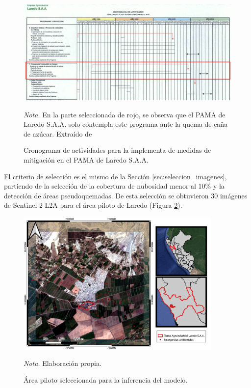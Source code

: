 \begin{figure}[H]
    \centering
    \caption{Cronograma de actividades para la implementa de medidas de mitigación en el PAMA de Laredo S.A.A.}
    \includegraphics[width=1\textwidth]{img/6_metodologia/laredo_programa.png}  
    \label{fig:laredo_programa}
    \begin{flushleft}
        \vspace{-\baselineskip}
        \textit{Nota.} En la parte seleccionada de rojo, se observa que el PAMA de Laredo S.A.A. solo contempla este programa ante la quema de caña de azúcar. Extraído de \citet[p. 24]{laredo_saa_programa_2000}        
        \vspace{-\baselineskip}
    \end{flushleft}
 \end{figure}

El criterio de selección es el mismo de la Sección \ref{sec:seleccion_imagenes}, partiendo de la selección de la cobertura de nubosidad menor al 10\% y la detección de áreas pseudoquemadas. 
De esta selección se obtuvieron 30 imágenes de Sentinel-2 L2A para el 
área piloto de Laredo (Figura \ref{fig:laredo}). 

\begin{figure}[H] 
    \centering 
    \caption{Área piloto seleccionada para la inferencia del modelo.} 
    \includegraphics[width=0.9\textwidth]{img/6_metodologia/laredo.png}
    \label{fig:laredo} 
    \begin{flushleft} 
        \vspace{-\baselineskip} 
        \textit{Nota.} Elaboración propia.
        \vspace{-\baselineskip} 
    \end{flushleft} 
\end{figure}




